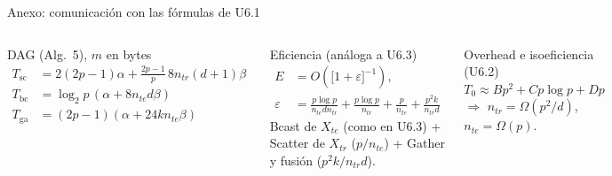 \documentclass[aspectratio=169,10pt]{beamer}
\newcommand{\ntr}{n_{tr}}
\newcommand{\nte}{n_{te}}
\newcommand{\tsub}[1]{T_{\mathrm{#1}}}
\renewenvironment{block}[1]{\begin{caja}[cajagris]{#1}}{\end{caja}}
\begin{document}
\begin{frame}{Anexo: comunicación con las fórmulas de U6.1}
\begin{columns}[T]
\begin{block}{DAG (Alg.\ 5), $m$ en bytes}
\vspace{-6pt}
\begin{align*}
\tsub{sc}&=2(2p-1)\alpha+\tfrac{2p-1}{p}\,8\ntr(d+1)\beta\\
\tsub{bc}&=\log_2p\,(\alpha+8\nte d\beta)\\
\tsub{ga}&=(2p-1)(\alpha+24k\nte\beta)
\end{align*}
\end{block}
\begin{block}{Eficiencia (análoga a U6.3)}
\[
\begin{aligned}
E&=O\!\left(\big[1+\varepsilon\big]^{-1}\right),\\
\varepsilon&=\tfrac{p\log p}{\nte d\ntr}+\tfrac{p\log p}{\ntr}+\tfrac{p}{\nte}+\tfrac{p^2k}{\ntr d}
\end{aligned}
\]
{\scriptsize Bcast de $X_{te}$ (como en U6.3) + Scatter de $X_{tr}$ ($p/\nte$) + Gather y fusión ($p^2k/\ntr d$).}
\end{block}
\begin{block}{Overhead e isoeficiencia (U6.2)}
$T_0\approx Bp^2+Cp\log p+Dp$ $\Rightarrow$ $\ntr=\Omega(p^2/d)$, $\nte=\Omega(p)$.
\end{block}
\end{columns}
\end{frame}
\end{document}
